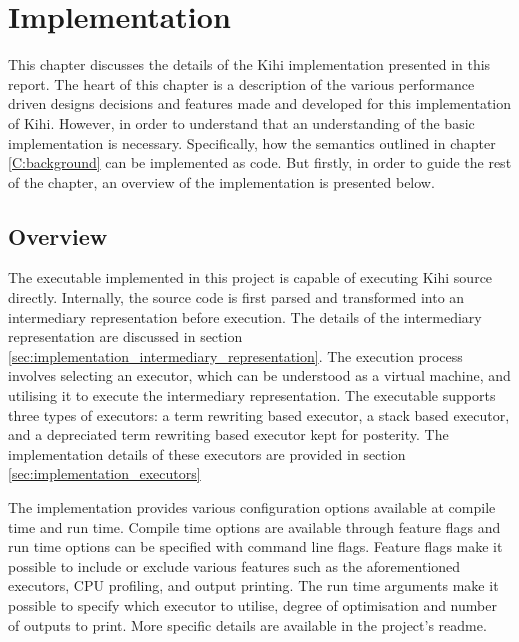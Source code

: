 \chapter{Implementation} \label{C:implementation} 
This chapter discusses the details of the Kihi implementation presented in this report. The heart of this chapter is a description of the various performance driven designs decisions and features made and developed for this implementation of Kihi. However, in order to understand that an understanding of the basic implementation is necessary. Specifically, how the semantics outlined in chapter \ref{C:background} can be implemented as code. But firstly, in order to guide the rest of the chapter, an overview of the implementation is presented below.

\section{Overview}
The executable implemented in this project is capable of executing Kihi source directly. Internally, the source code is first parsed and transformed into an intermediary representation before execution. The details of the intermediary representation are discussed in section \ref{sec:implementation_intermediary_representation}. The execution process involves selecting an executor, which can be understood as a virtual machine, and utilising it to execute the intermediary representation. The executable supports three types of executors: a term rewriting based executor, a stack based executor, and a depreciated term rewriting based executor kept for posterity. The implementation details of these executors are provided in section \ref{sec:implementation_executors}

The implementation provides various configuration options available at compile time and run time. Compile time options are available through feature flags and run time options can be specified with command line flags. Feature flags make it possible to include or exclude various features such as the aforementioned executors, CPU profiling, and output printing. The run time arguments make it possible to specify which executor to utilise, degree of optimisation and number of outputs to print. More specific details are available in the project's readme.



